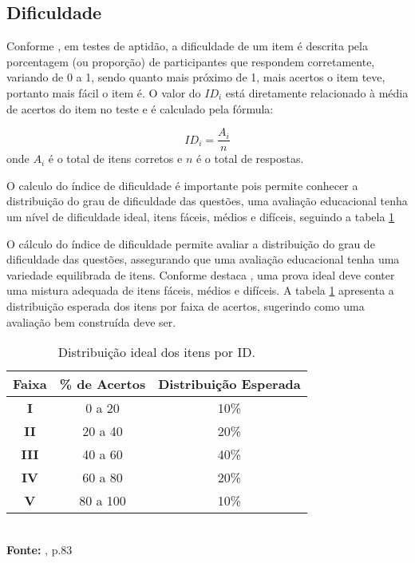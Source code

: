 \subsection{Dificuldade}

Conforme , em testes de aptidão, a dificuldade de um item é descrita pela porcentagem (ou proporção) de participantes que respondem corretamente, variando de 0 a 1, sendo quanto mais próximo de 1, mais acertos o item teve, portanto mais fácil o item é. O valor do $ID_i$ está diretamente relacionado à média de acertos do item no teste e é calculado  pela fórmula: 

\[
	ID_i =\dfrac{A_i}{n} 
\]
onde $A_i$ é o total de itens corretos e $n$ é o total de respostas. 

\begin{comment}
O calculo do índice de dificuldade é importante pois permite conhecer a distribuição do grau de dificuldade das questões que segundo \citeonline{pasquali2003}, para que uma avaliação educacional tenha um nível de dificuldade ideal, os índices devem seguir uma distribuição próxima à curva normal, com itens fáceis, médios e difíceis.
\end{comment}

O calculo do índice de dificuldade é importante pois permite conhecer a distribuição do grau de dificuldade das questões,  uma avaliação educacional tenha um nível de dificuldade ideal, itens fáceis, médios e difíceis, seguindo a tabela \ref{tabela-class-ID}

O cálculo do índice de dificuldade permite avaliar a distribuição do grau de dificuldade das questões, assegurando que uma avaliação educacional tenha uma variedade equilibrada de itens. Conforme destaca , uma prova ideal deve conter uma mistura adequada de itens fáceis, médios e difíceis. A tabela \ref{tabela-class-ID} apresenta a distribuição esperada dos itens por faixa de acertos, sugerindo como  uma avaliação bem construída deve ser.


\begin{table}[H]
		\centering
		\caption{Distribuição ideal dos itens por ID.}
		\label{tabela-class-ID}
		\begin{tabular}{ccc}
			\hline
			\textbf{Faixa} & \textbf{\% de Acertos}  &	  \textbf{Distribuição Esperada}   \\ 
			\hline
			\textbf{I}  & 0 a 20 & 10\%   \\ 
			\hline
			\textbf{II} & 20 a 40 &  20\%   \\
			\hline
			\textbf{III} & 40 a 60 &  40\%   \\ 
			\hline
			\textbf{IV} & 60 a 80 &  20\%   \\ 
			\hline
			\textbf{V} & 80 a 100 & 10\%   \\ 
			\hline
		\end{tabular}\\
		\vspace*{0.5cm}
		\small{\textbf{Fonte:} , p.83}
\end{table}

